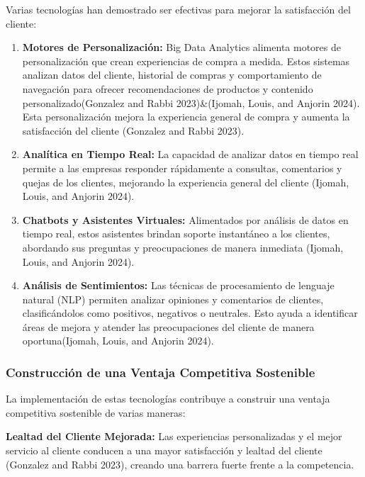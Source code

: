 \documentclass{article}
\begin{document}
Varias tecnologías han demostrado ser efectivas para mejorar la
satisfacción del cliente:

\begin{enumerate}
\def\labelenumi{\arabic{enumi}.}
\item
  \textbf{Motores de Personalización:} Big Data Analytics alimenta
  motores de personalización que crean experiencias de compra a medida.
  Estos sistemas analizan datos del cliente, historial de compras y
  comportamiento de navegación para ofrecer recomendaciones de productos
  y contenido personalizado(Gonzalez and Rabbi 2023)\&(Ijomah, Louis,
  and Anjorin 2024). Esta personalización mejora la experiencia general
  de compra y aumenta la satisfacción del cliente (Gonzalez and Rabbi
  2023).
\item
  \textbf{Analítica en Tiempo Real:} La capacidad de analizar datos en
  tiempo real permite a las empresas responder rápidamente a consultas,
  comentarios y quejas de los clientes, mejorando la experiencia general
  del cliente (Ijomah, Louis, and Anjorin 2024).
\item
  \textbf{Chatbots y Asistentes Virtuales:} Alimentados por análisis de
  datos en tiempo real, estos asistentes brindan soporte instantáneo a
  los clientes, abordando sus preguntas y preocupaciones de manera
  inmediata (Ijomah, Louis, and Anjorin 2024).
\item
  \textbf{Análisis de Sentimientos:} Las técnicas de procesamiento de
  lenguaje natural (NLP) permiten analizar opiniones y comentarios de
  clientes, clasificándolos como positivos, negativos o neutrales. Esto
  ayuda a identificar áreas de mejora y atender las preocupaciones del
  cliente de manera oportuna(Ijomah, Louis, and Anjorin 2024).
\end{enumerate}

\subsubsection{Construcción de una Ventaja Competitiva
Sostenible}\label{construcciuxf3n-de-una-ventaja-competitiva-sostenible}

La implementación de estas tecnologías contribuye a construir una
ventaja competitiva sostenible de varias maneras:

\textbf{Lealtad del Cliente Mejorada:} Las experiencias personalizadas y
el mejor servicio al cliente conducen a una mayor satisfacción y lealtad
del cliente (Gonzalez and Rabbi 2023), creando una barrera fuerte frente
a la competencia.
\end{document}
